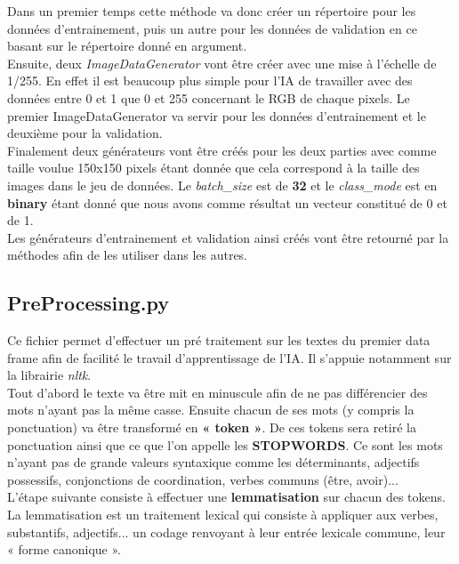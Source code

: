 \documentclass[12pt ,a4paper ]{article}
\begin{document}
\begin{multicols}{2}
Dans un premier temps cette méthode va donc créer un répertoire pour les données d'entrainement, puis un autre pour les données de validation en ce basant sur le répertoire donné en argument.\\

Ensuite, deux \textit{ImageDataGenerator} vont être créer avec une mise à l'échelle de 1/255. En effet il est beaucoup plus simple pour l'IA de travailler avec des données entre 0 et 1 que 0 et 255 concernant le RGB de chaque pixels. Le premier ImageDataGenerator va servir pour les données d'entrainement et le deuxième pour la validation.\\

Finalement deux générateurs vont être créés pour les deux parties avec comme taille voulue 150x150 pixels étant donnée que cela correspond à la taille des images dans le jeu de données. Le \textit{batch\_size} est de \textbf{32} et le \textit{class\_mode} est en \textbf{binary} étant donné que nous avons comme résultat un vecteur constitué de 0 et de 1.\\

Les générateurs d'entrainement et validation ainsi créés vont être retourné par la méthodes afin de les utiliser dans les autres. 

\subsection{PreProcessing.py}
Ce fichier permet d'effectuer un pré traitement sur les textes du premier data frame afin de facilité le travail d'apprentissage de l'IA. Il s'appuie notamment sur la librairie \textit{nltk}.\\

\noindent Tout d'abord le texte va être mit en minuscule afin de ne pas différencier des mots n'ayant pas la même casse. Ensuite chacun de ses mots (y compris la ponctuation) va être transformé en \textbf{« token »}. De ces tokens sera retiré la ponctuation ainsi que ce que l'on appelle les \textbf{STOPWORDS}. Ce sont les mots n'ayant pas de grande valeurs syntaxique comme les déterminants, adjectifs possessifs, conjonctions de coordination, verbes communs (être, avoir)...\\

\noindent L'étape suivante consiste à effectuer une \textbf{lemmatisation} sur chacun des tokens. La lemmatisation est un traitement lexical qui consiste à appliquer aux verbes, substantifs, adjectifs... un codage renvoyant à leur entrée lexicale commune, leur « forme canonique ».\\\\


\end{multicols}
\end{document}
